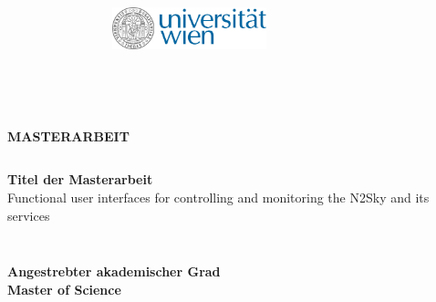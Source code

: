 


%


\thispagestyle{empty}


\begin{figure}[t]
 \centering

~~~~~~~~~~
\includegraphics[width=0.4\textwidth, right]{components/core/uni_logo.png}

\end{figure}


\begin{verbatim}


\end{verbatim}


\begin{verbatim}


\end{verbatim}

\begin{center}
\doublespacing
\textbf{\LARGE MASTERARBEIT}\\
\singlespacing
\begin{verbatim}

\end{verbatim}
\textbf{{Titel der Masterarbeit}} \\
\LARGE Functional user interfaces for controlling and monitoring the N2Sky and its services \\
\end{center}
\begin{verbatim}

\end{verbatim}
\begin{center}

\end{center}
\begin{verbatim}

\end{verbatim}
\begin{center}
\textbf{Angestrebter akademischer Grad \\ Master of Science}
\end{center}
\begin{verbatim}





\end{verbatim}

